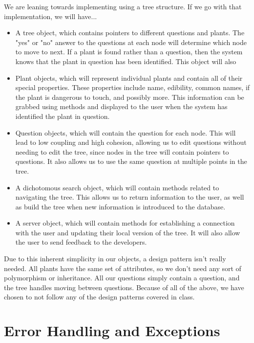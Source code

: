 \documentclass[a4paper]{article}
\begin{document}
We are leaning towards implementing using a tree structure. If we go with that implementation, we will have...

\begin{itemize}
\item A tree object, which contains pointers to different questions and plants. The "yes" or "no" answer to the questions at each node will determine which node to move to next. If a plant is found rather than a question, then the system knows that the plant in question has been identified. This object will also 
\item Plant objects, which will represent individual plants and contain all of their special properties. These properties include name, edibility, common names, if the plant is dangerous to touch, and possibly more. This information can be grabbed using methods and displayed to the user when the system has identified the plant in question.
\item Question objects, which will contain the question for each node. This will lead to low coupling and high cohesion, allowing us to edit questions without needing to edit the tree, since nodes in the tree will contain pointers to questions. It also allows us to use the same question at multiple points in the tree.
\item A dichotomous search object, which will contain methods related to navigating the tree. This allows us to return information to the user, as well as build the tree when new information is introduced to the database.
\item A server object, which will contain methods for establishing a connection with the user and updating their local version of the tree. It will also allow the user to send feedback to the developers.
\end{itemize}

Due to this inherent simplicity in our objects, a design pattern isn't really needed. All plants have the same set of attributes, so we don't need any sort of polymorphism or inheritance. All our questions simply contain a question, and the tree handles moving between questions. Because of all of the above, we have chosen to not follow any of the design patterns covered in class. 

\pagebreak

\section{Error Handling and Exceptions}
\end{document}
